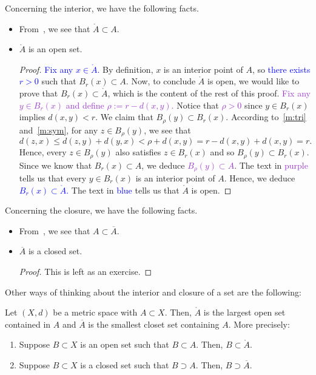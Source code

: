 \begin{rem}
	\label{rem:int_clos}
	Concerning the interior, we have the following facts.
	\begin{itemize}
		\item From~, we see that $\mathring{A} \subset A$.
		\item $\mathring{A}$ is an open set.
		\begin{proof}
			\textcolor{blue}{Fix any $x\in \mathring{A}$.} By definition, $x$ is an interior point of $A$, so \textcolor{blue}{there exists $r>0$} such that $B_r(x) \subset A$. Now, to conclude $\mathring{A}$ is open, we would like to prove that $B_r(x)\subset \mathring{A}$, which is the content of the rest of this proof. \textcolor{DarkOrchid}{Fix any $y \in B_r(x)$ and define $\rho:= r - d(x,y)$.} Notice that \textcolor{DarkOrchid}{$\rho>0$} since $y \in B_r(x)$ implies $d(x,y) < r$. We claim that $B_\rho(y) \subset B_r(x)$. According to~\ref{m:tri} and~\ref{m:sym}, for any $z \in B_\rho(y)$, we see that
			\[
			d(z,x) \le d(z,y) + d(y,x) < \rho + d(x,y) = r - d(x,y) + d(x,y) = r.
			\]
			Hence, every $z\in B_\rho(y)$ also satisfies $z\in B_r(x)$ and so $B_\rho(y) \subset B_r(x)$. Since we know that $B_r(x) \subset A$, we deduce \textcolor{DarkOrchid}{$B_\rho(y)\subset A$}. The text in \textcolor{DarkOrchid}{purple} tells us that every $y\in B_r(x)$ is an interior point of $A$. Hence, we deduce \textcolor{blue}{$B_r(x) \subset \mathring{A}$.} The text in \textcolor{blue}{blue} tells us that $\mathring{A}$ is open.
		\end{proof}
	\end{itemize}
	Concerning the closure, we have the following facts.
	\begin{itemize}
		\item From~, we see that $A \subset \overline{A}$.
		\item $\overline{A}$ is a closed set.
		\begin{proof}
			This is left as an exercise.
		\end{proof}
	\end{itemize}
\end{rem}
Other ways of thinking about the interior and closure of a set are the following:
\begin{lemma}
	\label{lem:int_large}
	Let $(X,d)$ be a metric space with $A\subset X$. Then, $\mathring{A}$ is the largest open set contained in $A$ and $\overline{A}$ is the smallest closet set containing $A$. More precisely:
	\begin{enumerate}
		\item \label{int_large} Suppose $B\subset X$ is an open set such that $B \subset A$. Then, $B\subset \mathring{A}$.
		\item \label{clos_small} Suppose $B\subset X$ is a closed set such that $B \supset A$. Then, $B \supset \overline{A}$.
	\end{enumerate}
\end{lemma}
